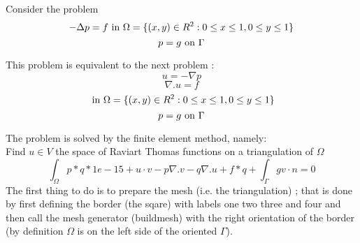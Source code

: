 \documentclass[twoside]{book}
\newif\ifpdf
\begin{document}
\graphicspath{{./}{plots/}}
\ifpdf
\DeclareGraphicsExtensions{.pdf, .jpg, .tif}
\else
{}
\fi

\let\subsubsection\subsection
\let\subsection\section
\let\section\chapter



Consider the problem
\begin{equation}
 -\Delta p = f \hbox{ in } \Omega=\{(x,y)\in R^2 : 0 \le x \le 1 , 0 \le y \le 1\}
\end{equation}
\begin{equation}
p = g \hbox{ on } \Gamma
\end{equation}

This problem is equivalent to the next problem : 
\begin{equation}
 u = -\nabla p 
\end{equation}
\begin{equation}
 \nabla.u = f
\end{equation}
\begin{equation}
\hbox{ in } \Omega=\{(x,y)\in R^2 : 0 \le x \le 1 , 0 \le y \le 1\}
\end{equation}
\begin{equation}
p = g \hbox{ on } \Gamma
\end{equation}

The problem is solved by the finite element method, namely:
\\
Find $u\in V$ the space of Raviart Thomas functions on a triangulation of $\Omega$ 
\begin{equation}
   \int_\Omega p*q*1e-15 + u\cdot v -p\nabla.v -q\nabla.u +f*q + \int_{\Gamma} gv\cdot n = 0
\end{equation}
The first thing to do is to prepare the mesh (i.e. the triangulation) ;
that is done by first defining the border (the sqare) with labels one two three and four  and then call the mesh generator (buildmesh) with the right orientation of the border (by definition $\Omega$ is on the left side of the oriented $\Gamma$).
\end{document}
